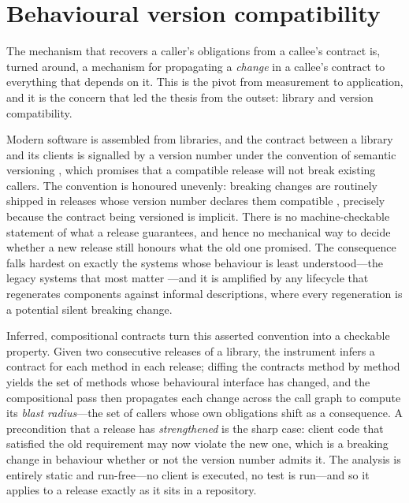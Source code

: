\section{Behavioural version compatibility}
\label{sec:comp-versioning}

The mechanism that recovers a caller's obligations from a callee's contract is,
turned around, a mechanism for propagating a \emph{change} in a callee's contract
to everything that depends on it. This is the pivot from measurement to
application, and it is the concern that led the thesis from the outset: library
and version compatibility.

Modern software is assembled from libraries, and the contract between a library
and its clients is signalled by a version number under the convention of semantic
versioning \citep{preston2013semver}, which promises that a compatible release
will not break existing callers. The convention is honoured unevenly: breaking
changes are routinely shipped in releases whose version number declares them
compatible \citep{raemaekers2017semver}, precisely because the contract being
versioned is implicit. There is no machine-checkable statement of what a release
guarantees, and hence no mechanical way to decide whether a new release still
honours what the old one promised. The consequence falls hardest on exactly the
systems whose behaviour is least understood---the legacy systems that most matter
\citep{feathers2004legacy}---and it is amplified by any lifecycle that regenerates
components against informal descriptions, where every regeneration is a potential
silent breaking change.

Inferred, compositional contracts turn this asserted convention into a checkable
property. Given two consecutive releases of a library, the instrument infers a
contract for each method in each release; diffing the contracts method by method
yields the set of methods whose behavioural interface has changed, and the
compositional pass then propagates each change across the call graph to compute
its \emph{blast radius}---the set of callers whose own obligations shift as a
consequence. A precondition that a release has \emph{strengthened} is the sharp
case: client code that satisfied the old requirement may now violate the new one,
which is a breaking change in behaviour whether or not the version number admits
it. The analysis is entirely static and run-free---no client is executed, no test
is run---and so it applies to a release exactly as it sits in a repository.

